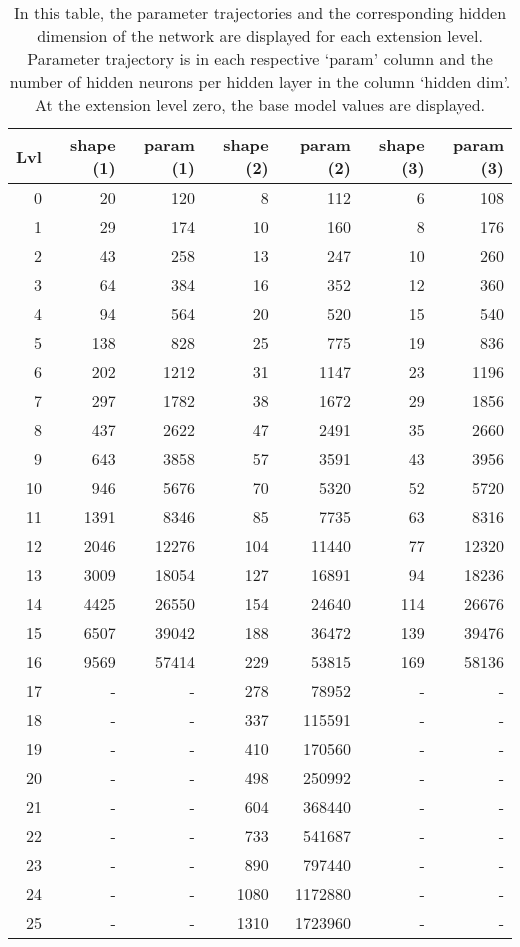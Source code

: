 \begin{table}[ht]
    {
    \sffamily
    \caption{
    In this table, the parameter trajectories and the corresponding hidden dimension of the network are displayed for each extension level. 
    Parameter trajectory is in each respective `param' column and the number of hidden neurons per hidden layer in the column `hidden dim'.
    At the extension level zero, the base model values are displayed.
    }\label{tab:trajectory}
    \begin{tabular}{rrrrrrr}
    \toprule
    Lvl & shape (1) & param (1) & shape (2) & param (2) & shape (3) & param (3) \\
    \midrule
    0 & 20 & 120 & 8 & 112 & 6 & 108 \\
    1 & 29 & 174 & 10 & 160 & 8 & 176 \\
    2 & 43 & 258 & 13 & 247 & 10 & 260 \\
    3 & 64 & 384 & 16 & 352 & 12 & 360 \\
    4 & 94 & 564 & 20 & 520 & 15 & 540 \\
    5 & 138 & 828 & 25 & 775 & 19 & 836 \\
    6 & 202 & 1212 & 31 & 1147 & 23 & 1196 \\
    7 & 297 & 1782 & 38 & 1672 & 29 & 1856 \\
    8 & 437 & 2622 & 47 & 2491 & 35 & 2660 \\
    9 & 643 & 3858 & 57 & 3591 & 43 & 3956 \\
    10 & 946 & 5676 & 70 & 5320 & 52 & 5720 \\
    11 & 1391 & 8346 & 85 & 7735 & 63 & 8316 \\
    12 & 2046 & 12276 & 104 & 11440 & 77 & 12320 \\
    13 & 3009 & 18054 & 127 & 16891 & 94 & 18236 \\
    14 & 4425 & 26550 & 154 & 24640 & 114 & 26676 \\
    15 & 6507 & 39042 & 188 & 36472 & 139 & 39476 \\
    16 & 9569 & 57414 & 229 & 53815 & 169 & 58136 \\
    17 & - & - & 278 & 78952 & - & - \\
    18 & - & - & 337 & 115591 & - & - \\
    19 & - & - & 410 & 170560 & - & - \\
    20 & - & - & 498 & 250992 & - & - \\
    21 & - & - & 604 & 368440 & - & - \\
    22 & - & - & 733 & 541687 & - & - \\
    23 & - & - & 890 & 797440 & - & - \\
    24 & - & - & 1080 & 1172880 & - & - \\
    25 & - & - & 1310 & 1723960 & - & - \\
    \bottomrule
    \end{tabular}
    }
\end{table}

